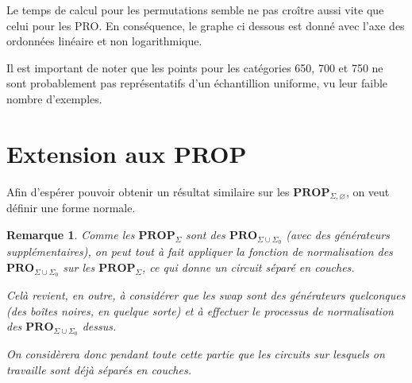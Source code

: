 \documentclass[12pt, a4paper]{article}
\newtheorem{remark}[definition]{Remarque}
\def\pro#1{ \mathbf{PRO}_{ #1 } }
\def\prop#1{ \mathbf{PROP}_{ #1 } }
\begin{document}
Le temps de calcul pour les permutations semble ne pas croître aussi vite que celui pour les PRO. En conséquence, le graphe ci dessous est donné avec l'axe des ordonnées linéaire et non logarithmique.

Il est important de noter que les points pour les catégories 650, 700 et 750 ne sont probablement pas représentatifs d'un échantillion uniforme, vu leur faible nombre d'exemples.


\section{Extension aux PROP}

Afin d'espérer pouvoir obtenir un résultat similaire sur les $\prop{\Sigma, \varnothing}$, on veut définir une forme normale.

\begin{remark}
    Comme les $\prop{\Sigma}$ sont des $\pro{\Sigma \cup \Sigma_0}$ (avec des générateurs supplémentaires), on peut tout à fait appliquer la fonction de normalisation des $\pro{\Sigma \cup \Sigma_0}$ sur les $\prop{\Sigma}$, ce qui donne un circuit séparé en couches.

    Celà revient, en outre, à considérer que les swap sont des générateurs quelconques (des boîtes noires, en quelque sorte) et à effectuer le processus de normalisation des $\pro{\Sigma \cup \Sigma_0}$ dessus.

    On considèrera donc pendant toute cette partie que les circuits sur lesquels on travaille sont déjà séparés en couches.
\end{remark}
\end{document}
